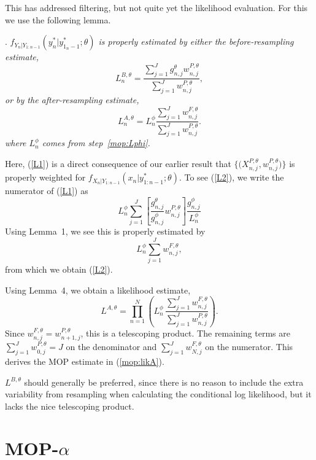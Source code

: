 \documentclass[12p]{article}
\begin{document}
This has addressed filtering, but not quite yet the likelihood evaluation. For this we use the following lemma.

. {\it
  $f_{Y_n|Y_{1:n-1}}(y_n^*|y_{1_n-1}^*;\theta)$ is properly estimated by either the before-resampling estimate,
\begin{equation}\label{L1}
L_n^{B,\theta} =  \frac{\sum_{j=1}^Jg^\theta_{n,j} w^{P,\theta}_{n,j}}{\sum_{j=1}^J  w^{P,\theta}_{n,j}},
\end{equation}
or by the after-resampling estimate,
\begin{equation}\label{L2}
L_n^{A,\theta} = L^\phi_n \frac{\sum_{j=1}^Jw^{F,\theta}_{n,j}}{\sum_{j=1}^J  w^{P,\theta}_{n,j}}.
\end{equation}
where $L^\phi_n$ comes from step~\ref{mop:Lphi}.
}

Here, (\ref{L1}) is a direct consequence of our earlier result that $\{ \big(X^{P,\theta}_{n,j},w^{P,\theta}_{n,j}\big) \}$ is properly weighted for $f_{X_{n}|Y_{1:n-1}}(x_{n}|y^*_{1:n-1};\theta)$.
To see  (\ref{L2}),
we write the numerator of (\ref{L1}) as
\[
L^\phi_n \sum_{j=1}^J \left[ \frac{g^\theta_{n,j}}{g^\phi_{n,j}} w^{P,\theta}_{n,j}\right] \frac{g^\phi_{n,j}}{L_n^\phi}
\]
Using Lemma~1, we see this is properly estimated by
\[
L^\phi_n \sum_{j=1}^J w^{F,\theta}_{n,j},
\]
from which we obtain (\ref{L2}).

Using Lemma~4, we obtain a likelihood estimate,
\[
L^{A,\theta} = \prod_{n=1}^N \left( L^\phi_n \, \frac{\sum_{j=1}^J w^{F,\theta}_{n,j}}{\sum_{j=1}^J w^{P,\theta}_{n,j}}\right).
\]
Since $w^{F,\theta}_{n,j}=w^{P,\theta}_{n+1,j}$, this is a telescoping product. The remaining terms are
$\sum_{j=1}^J w^{P,\theta}_{0,j} = J$ on the denominator and $\sum_{j=1}^J w^{F,\theta}_{N,j}$ on the numerator.
This derives the MOP estimate in (\ref{mop:likA}).

$L^{B,\theta}$ should generally be preferred, since there is no reason to include the extra variability from resampling when calculating the conditional log likelihood, but it lacks the nice telescoping product.

\section{MOP-$\alpha$}
\end{document}
